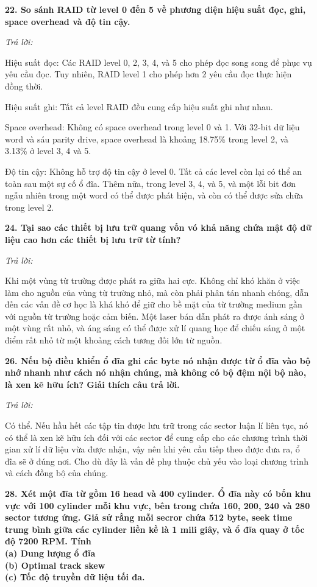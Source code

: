 \documentclass{report}
\begin{document}
\bigskip
\textbf{22. So sánh RAID từ level 0 đến 5 về phương diện hiệu suất đọc, ghi, space overhead và độ tin cậy.}

\bigskip
\textit{Trả lời:}

\smallskip
Hiệu suất đọc: Các RAID level 0, 2, 3, 4, và 5 cho phép đọc song song để phục vụ yêu cầu đọc. Tuy nhiên, RAID level 1 cho phép hơn 2 yêu cầu đọc thực hiện đồng thời.

\smallskip
Hiệu suất ghi: Tất cả level RAID đều cung cấp hiệu suất ghi như nhau.

\smallskip
Space overhead: Không có space overhead trong level 0 và 1. Với 32-bit dữ liệu word và sáu parity drive, space overhead là khoảng 18.75\% trong level 2, và 3.13\% ở level 3, 4 và 5.

\smallskip
Độ tin cậy: Không hỗ trợ độ tin cậy ở level 0. Tất cả các level còn lại có thể an toàn sau một sự cố ổ đĩa. Thêm nữa, trong level 3, 4, và 5, và một lỗi bit đơn ngẫu nhiên trong một word có thể được phát hiện, và còn có thể được sửa chữa trong level 2.

\bigskip
\textbf{24. Tại sao các thiết bị lưu trữ quang vốn vó khả năng chứa mật độ dữ liệu cao hơn các thiết bị lưu trữ từ tính?}

\bigskip
\textit{Trả lời:}

\smallskip
Khi một vùng từ trường được phát ra giữa hai cực. Không chỉ khó khăn ở việc làm cho nguồn của vùng từ trường nhỏ, mà còn phải phân tán nhanh chóng, dẫn đến các vấn đề cơ học là khá khó để giữ cho bề mặt của từ trường medium gần với nguồn từ trường hoặc cảm biến. Một laser bán dẫn phát ra được ánh sáng ở một vùng rất nhỏ, và áng sáng có thể được xử lí quang học để chiếu sáng ở một điểm rất nhỏ từ một khoảng cách tương đối lớn từ nguồn.

\bigskip
\textbf{26. Nếu bộ điều khiển ổ đĩa ghi các byte nó nhận được từ ổ đĩa vào bộ nhớ nhanh như cách nó nhận chúng, mà không có bộ đệm nội bộ nào, là xen kẽ hữu ích? Giải thích câu trả lời.}

\bigskip
\textit{Trả lời:}

\smallskip
Có thể. Nếu hầu hết các tập tin được lưu trữ trong các sector luận lí liên tục, nó có thể là xen kẽ hữu ích đối với các sector để cung cấp cho các chương trình thời gian xử lí dữ liệu vừa được nhận, vậy nên khi yêu cầu tiếp theo được đưa ra, ổ đĩa sẽ ở đúng nơi. Cho dù đây là vấn đề phụ thuộc chủ yếu vào loại chương trình và cách đồng bộ của chúng.

\bigskip
\textbf{28. Xét một đĩa từ gồm 16 head và 400 cylinder. Ổ đĩa này có bốn khu vực với 100 cylinder mỗi khu vực, bên trong chứa 160, 200, 240 và 280 sector tương ứng. Giả sử rằng mỗi secror chứa 512 byte, seek time trung bình giữa các cylinder liền kề là 1 mili giây, và ổ đĩa quay ở tốc độ 7200 RPM. Tính \\
(a) Dung lượng ổ đĩa\\
(b) Optimal track skew\\
(c) Tốc độ truyền dữ liệu tối đa.}
\end{document}
